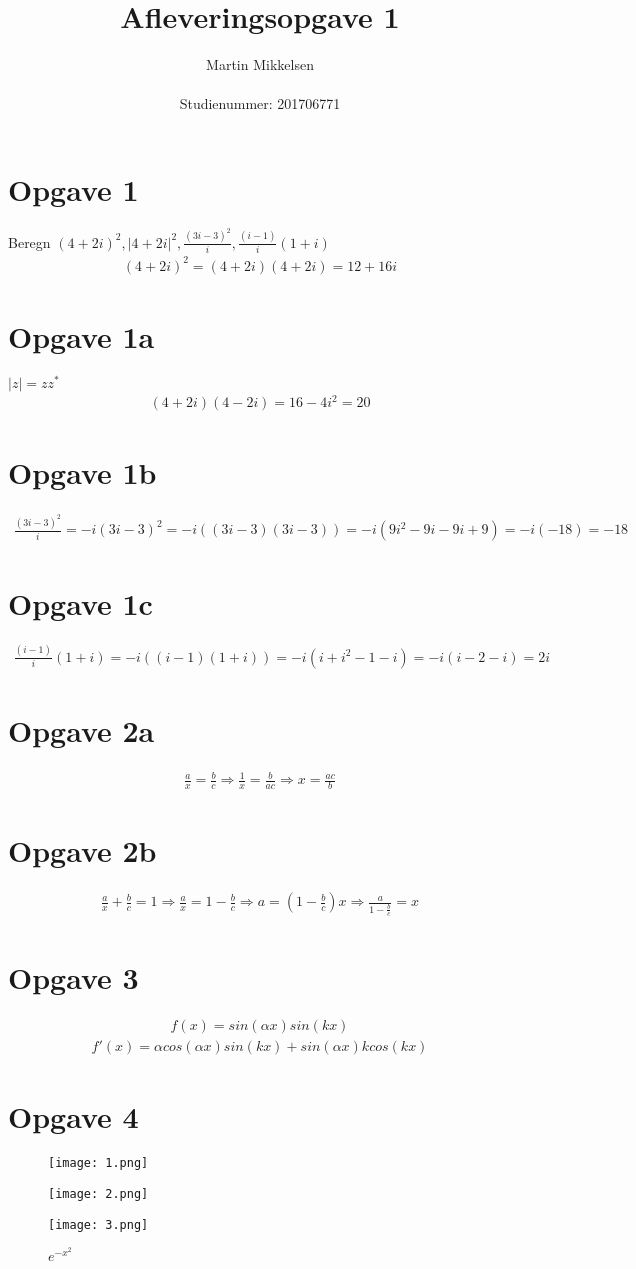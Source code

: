 \documentclass{article}
\author{Martin Mikkelsen \\ \\
Studienummer: 201706771}
\title{Afleveringsopgave 1}
\newcommand{\eq}[1]{\begin{align*}#1\end{align*}}
\begin{document}
\maketitle
\thispagestyle{firststyle}
\section*{Opgave 1} 
Beregn $ (4+2i)^2, |4+2i|^2, \frac{(3i-3)^2}{i}, \frac{(i-1)}{i}(1+i) $ 
\eq{(4+2i)^2=(4+2i)(4+2i)=12+16i}
\section*{Opgave 1a} 
$ |z|=zz^* $
\eq{(4+2i)(4-2i)=16-4i^2=20}
\section*{Opgave 1b}
\eq{\frac{(3i-3)^2}{i}=-i(3i-3)^2=-i((3i-3)(3i-3))=-i(9i^2-9i-9i+9)=-i(-18)=-18}
\section*{Opgave 1c}
\eq{\frac{(i-1)}{i}(1+i)=-i((i-1)(1+i))=-i(i+i^2-1-i)=-i(i-2-i)=2i}
\section*{Opgave 2a}
\eq{\frac{a}{x}=\frac{b}{c} \Rightarrow \frac{1}{x}=\frac{b}{ac} \Rightarrow x= \frac{ac}{b}} 
\section*{Opgave 2b}
\eq{\frac{a}{x}+\frac{b}{c}=1 \Rightarrow \frac{a}{x}=1-\frac{b}{c} \Rightarrow a=(1-\frac{b}{c})x \Rightarrow \frac{a}{1-\frac{b}{c}}=x} 
\section*{Opgave 3}
\eq{f(x)=sin(\alpha x)sin(kx)} 
\eq{f'(x)=\alpha cos(\alpha x)sin(kx)+sin(\alpha x)kcos(kx) }
\section*{Opgave 4}
\begin{figure}[!htb]
	\texttt{[image: 1.png]}
	\caption{$ \frac{1}{2}e^{-\frac{x}{2}} $}
	\endminipage\hfill
	\texttt{[image: 2.png]}
	\caption{$ \frac{1}{2}e^{-2x} $}
	\endminipage\hfill
	\texttt{[image: 3.png]}
	\caption{$ e^{-x^2} $}
	\endminipage
\end{figure}
\end{document}
